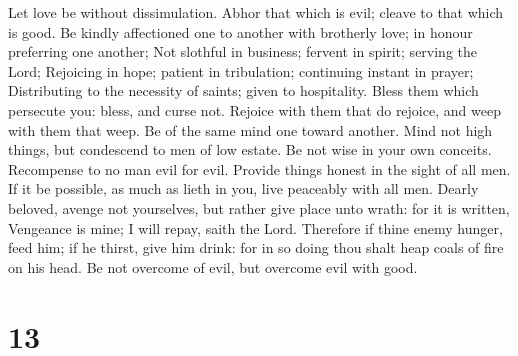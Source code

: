  Let love be without dissimulation. Abhor that which is
evil; cleave to that which is good.  Be kindly
affectioned one to another with brotherly love; in honour preferring one
another;  Not slothful in business; fervent in spirit;
serving the Lord;  Rejoicing in hope; patient in
tribulation; continuing instant in prayer;  Distributing
to the necessity of saints; given to hospitality.  Bless
them which persecute you: bless, and curse not.  Rejoice
with them that do rejoice, and weep with them that weep. 
Be of the same mind one toward another. Mind not high things, but
condescend to men of low estate. Be not wise in your own conceits.
 Recompense to no man evil for evil. Provide things
honest in the sight of all men.  If it be possible, as
much as lieth in you, live peaceably with all men. 
Dearly beloved, avenge not yourselves, but rather give place unto wrath:
for it is written, Vengeance is mine; I will repay, saith the Lord.
 Therefore if thine enemy hunger, feed him; if he thirst,
give him drink: for in so doing thou shalt heap coals of fire on his
head.  Be not overcome of evil, but overcome evil with
good.

\hypertarget{section-12}{%
\section{13}\label{section-12}}


